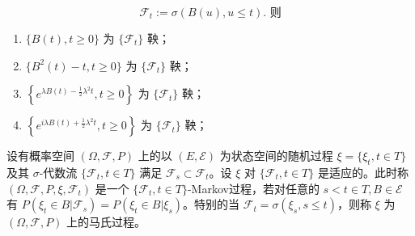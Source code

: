 \documentclass[lang=cn,10pt,thmcnt=section]{elegantbook}
\begin{document}
\begin{theorem}
	\[
\mathcal{F}_t := \sigma(B(u), u \leq t). \text{ 则}
\]
\begin{enumerate}
    \item $\{B(t), t \geq 0\}$ 为 $\{\mathcal{F}_t\}$ 鞅；
    \item $\{B^2(t) - t, t \geq 0\}$ 为 $\{\mathcal{F}_t\}$ 鞅；
    \item $\left\{e^{\lambda B(t) - \frac{1}{2} \lambda^2 t}, t \geq 0\right\}$ 为 $\{\mathcal{F}_t\}$ 鞅；
    \item $\left\{e^{i \lambda B(t) + \frac{1}{2} \lambda^2 t}, t \geq 0\right\}$ 为 $\{\mathcal{F}_t\}$ 鞅；
\end{enumerate}
\end{theorem}
\begin{definition}
	设有概率空间 $(\Omega, \mathcal{F}, P)$ 上的以 $(E, \mathcal{E})$ 为状态空间的随机过程 $\xi = \{\xi_t, t \in T\}$ 及其 $\sigma$-代数流 $\{\mathcal{F}_t, t \in T\}$ 满足 $\mathcal{F}_s \subset \mathcal{F}_t$。设 $\xi$ 对 $\{\mathcal{F}_t, t \in T\}$ 是适应的。此时称 $(\Omega, \mathcal{F}, P, \xi, \mathcal{F}_t)$ 是一个 $\{\mathcal{F}_t, t \in T\}$-Markov过程，若对任意的 $s < t \in T, B \in \mathcal{E}$ 有 $P(\xi_t \in B | \mathcal{F}_s) = P(\xi_t \in B | \xi_s)$。特别的当 $\mathcal{F}_t = \sigma(\xi_s, s \leq t)$，则称 $\xi$ 为 $(\Omega, \mathcal{F}, P)$ 上的马氏过程。
\end{definition}
\end{document}
